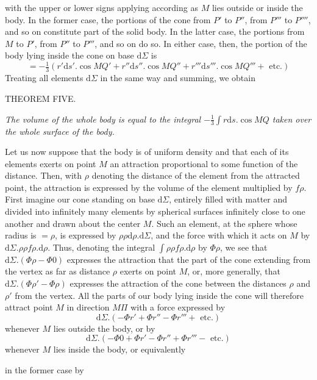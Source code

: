 with the upper or lower signs applying according as $M$ lies outside or inside the body. In the former case, the portions of the cone from $P'$ to $P''$, from $P'''$ to $P''''$, and so on constitute part of the solid body. In the latter case, the portions from $M$ to $P'$, from $P''$ to $P'''$, and so on do so. In either case, then, the portion of the body lying inside the cone on base $\mathrm{d}\Sigma$ is
\[
=-\tfrac13(r'\mathrm{d}s'.\cos MQ'+r''\mathrm{d}s''.\cos MQ''+r'''\mathrm{d}s'''.\cos MQ'''+\text{ etc.})
\]
Treating all elements $\mathrm{d}\Sigma$ in the same way and summing, we obtain
\par\medskip{}
\begin{center}THEOREM FIVE.\end{center}
\par
\textit{The volume of the whole body is equal to the integral $-\tfrac13\int r\mathrm{d}s.\cos MQ$ taken over the whole surface of the body.}

\par
Let us now suppose that the body is of uniform density and that each of its elements exerts on point $M$ an attraction proportional to some function of the distance. Then, with $\rho$ denoting the distance of the element from the attracted point, the attraction is expressed by the volume of the element multiplied by $f\rho$. First imagine our cone standing on base $\mathrm{d}\Sigma$, entirely filled with matter and divided into infinitely many elements by spherical surfaces infinitely close to one another and drawn about the center $M$. Such an element, at the sphere whose radius is $=\rho$, is expressed by $\rho\rho\mathrm{d}\rho.\mathrm{d}\Sigma$, and the force with which it acts on $M$ by $\mathrm{d}\Sigma.\rho\rho f\rho.\mathrm{d}\rho$. Thus, denoting the integral $\int\rho\rho f\rho.\mathrm{d}\rho$ by $\Phi\rho$, we see that $\mathrm{d}\Sigma.(\Phi\rho-\Phi0)$ expresses the attraction that the part of the cone extending from the vertex as far as distance $\rho$ exerts on point $M$, or, more generally, that $\mathrm{d}\Sigma.(\Phi\rho'-\Phi\rho)$ expresses the attraction of the cone between the distances $\rho$ and $\rho'$ from the vertex. All the parts of our body lying inside the cone will therefore attract point $M$ in direction $M\Pi$ with a force expressed by
\[
\mathrm{d}\Sigma.(-\Phi r'+\Phi r''-\Phi r'''+\text{ etc.})
\]
whenever $M$ lies outside the body, or by
\[
\mathrm{d}\Sigma.(-\Phi0+\Phi r'-\Phi r''+\Phi r'''-\text{ etc.})
\]
whenever $M$ lies inside the body, or equivalently
\par
in the former case by
